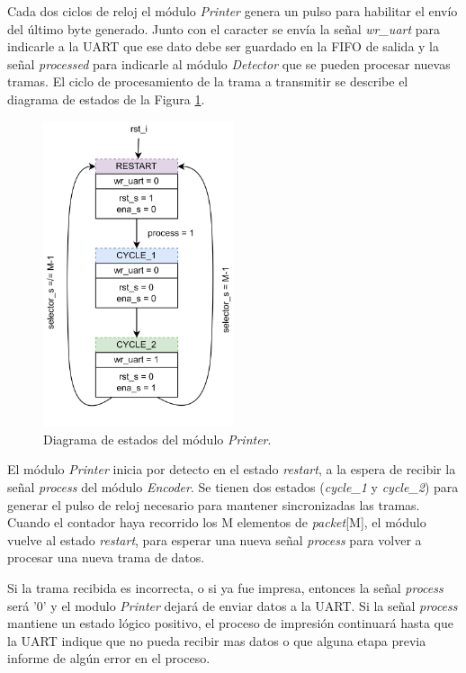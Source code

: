 	Cada dos ciclos de reloj el módulo \textit{Printer} genera un pulso para habilitar el envío del último byte generado. Junto con el caracter se envía la señal \textit{wr\_uart} para indicarle a la UART que ese dato debe ser guardado en la FIFO de salida y la señal \textit{processed} para indicarle al módulo \textit{Detector} que se pueden procesar nuevas tramas. El ciclo de procesamiento de la trama a transmitir se describe el diagrama de estados de la Figura \ref{fig:Printer_FSMD}.
	
	\begin{figure}[H]
		\centering
		\includegraphics[width=0.5\textwidth]{Figuras/Printer_FSMD.png}
		\centering\caption{Diagrama de estados del módulo \textit{Printer}.}
		\label{fig:Printer_FSMD}
	\end{figure}
	
	El módulo \textit{Printer} inicia por detecto en el estado \textit{restart}, a la espera de recibir la señal \textit{process} del módulo \textit{Encoder}. Se tienen dos estados (\textit{cycle\_1} y \textit{cycle\_2}) para generar el pulso de reloj necesario para mantener sincronizadas las tramas. Cuando el contador haya recorrido los M elementos de \textit{packet}[M], el módulo vuelve al estado \textit{restart}, para esperar una nueva señal \textit{process} para volver a procesar una nueva trama de datos.
	
	Si la trama recibida es incorrecta, o si ya fue impresa, entonces la señal \textit{process} será '0' y el modulo \textit{Printer} dejará de enviar datos a la UART. Si la señal \textit{process} mantiene un estado lógico positivo, el proceso de impresión continuará hasta que la UART indique que no pueda recibir mas datos o que alguna etapa previa informe de algún error en el proceso.